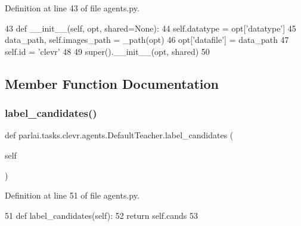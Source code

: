 Definition at line 43 of file agents.\+py.


\begin{DoxyCode}
43     \textcolor{keyword}{def }\_\_init\_\_(self, opt, shared=None):
44         self.datatype = opt[\textcolor{stringliteral}{'datatype'}]
45         data\_path, self.images\_path = \_path(opt)
46         opt[\textcolor{stringliteral}{'datafile'}] = data\_path
47         self.id = \textcolor{stringliteral}{'clevr'}
48 
49         super().\_\_init\_\_(opt, shared)
50 
\end{DoxyCode}


\subsection{Member Function Documentation}
\mbox{\label{classparlai_1_1tasks_1_1clevr_1_1agents_1_1DefaultTeacher_a5d5bf049239e335502995a785c292f64}} 
\subsubsection{\texorpdfstring{label\+\_\+candidates()}{label\_candidates()}}
{\footnotesize\ttfamily def parlai.\+tasks.\+clevr.\+agents.\+Default\+Teacher.\+label\+\_\+candidates (\begin{DoxyParamCaption}\item[{}]{self }\end{DoxyParamCaption})}



Definition at line 51 of file agents.\+py.


\begin{DoxyCode}
51     \textcolor{keyword}{def }label\_candidates(self):
52         \textcolor{keywordflow}{return} self.cands
53 
\end{DoxyCode}
\mbox{\label{classparlai_1_1tasks_1_1clevr_1_1agents_1_1DefaultTeacher_ab0f3f8e22c6a0fe921f0cae4a20864f8}} 
